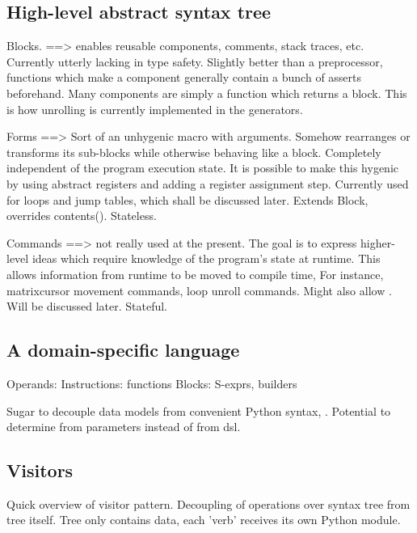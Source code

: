 \subsection{High-level abstract syntax tree}
\begin{description}
  \item Blocks. ==> enables reusable components, comments, stack traces, etc. Currently utterly lacking in type safety. Slightly better than a preprocessor, functions which make a component generally contain a bunch of asserts beforehand. Many components are simply a function which returns a block. This is how unrolling is currently implemented in the generators.

  \item Forms ==> Sort of an unhygenic macro with arguments. Somehow rearranges or transforms its sub-blocks while otherwise behaving like a block. Completely independent of the program execution state. It is possible to make this hygenic by using abstract registers and adding a register assignment step. Currently used for loops and jump tables, which shall be discussed later. Extends Block, overrides contents(). Stateless.

  \item Commands ==> not really used at the present. The goal is to express higher-level ideas which require knowledge of the program's state at runtime. This allows information from runtime to be moved to compile time, For instance, matrixcursor movement commands, loop unroll commands. Might also allow . Will be discussed later. Stateful.
\end{description}

\subsection{A domain-specific language}
  

Operands: 
Instructions: functions
Blocks: S-exprs, builders


  Sugar to decouple data models from convenient Python syntax,
    . Potential to determine from parameters instead of from dsl. 


\subsection{Visitors}
Quick overview of visitor pattern. Decoupling of operations over syntax tree from tree itself. Tree only contains data, each 'verb' receives its own Python module.

